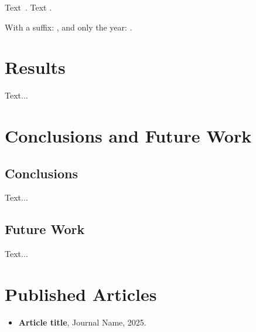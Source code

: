 \documentclass[12pt]{report}
\begin{document}
Text~\cite{lamport94}. Text \textcite{knuth84}.

With a suffix: \cite[p.~10]{lamport94}, and only the year: \citeyear{knuth84}.


\chapter{Results}

Text...

\chapter{Conclusions and Future Work}

\section{Conclusions}

Text...

\section{Future Work}

Text...


\appendix

\chapter{Published Articles}

\begin{itemize}
  \item \textbf{Article title}, Journal Name, 2025.
\end{itemize}


\printbibliography[heading=bibintoc]
\end{document}
